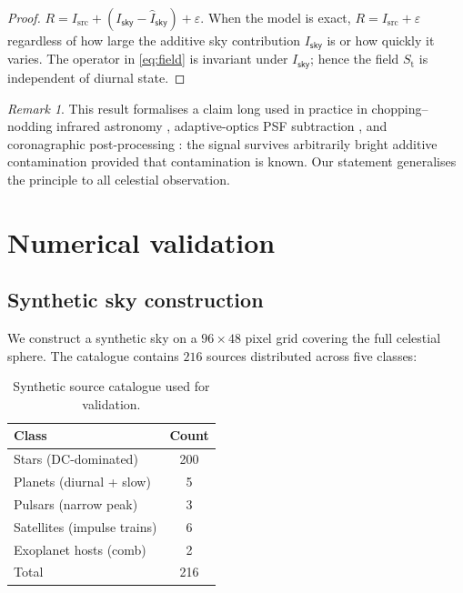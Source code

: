 \documentclass[11pt,twocolumn,a4paper]{article}
\theoremstyle{definition}
\theoremstyle{remark}
\newtheorem{remark}[theorem]{Remark}
\newcommand{\Sfield}{S_{\mathrm{t}}}
\newcommand{\sky}{\mathsf{sky}}
\newcommand{\src}{\mathrm{src}}
\begin{document}
\begin{proof}
$R = I_\src + (I_\sky - \widehat{I}_\sky) + \varepsilon$. When the
model is exact, $R = I_\src + \varepsilon$ regardless of how large the
additive sky contribution $I_\sky$ is or how quickly it varies. The
operator in \eqref{eq:field} is invariant under $I_\sky$; hence the
field $\Sfield$ is independent of diurnal state.
\end{proof}

\begin{remark}
This result formalises a claim long used in practice in
chopping--nodding infrared astronomy \citep{longmore1979}, adaptive-optics
PSF subtraction \citep{marois2006}, and coronagraphic post-processing
\citep{thalmann2011}: the signal survives arbitrarily bright additive
contamination provided that contamination is known. Our statement
generalises the principle to all celestial observation.
\end{remark}

\section{Numerical validation}
\label{sec:validation}

\subsection{Synthetic sky construction}

We construct a synthetic sky on a $96 \times 48$ pixel grid covering
the full celestial sphere. The catalogue contains $216$ sources
distributed across five classes:

\begin{table}[H]
\centering\small
\caption{Synthetic source catalogue used for validation.}
\label{tab:catalogue}
\begin{tabular}{lc}
\toprule
Class & Count \\
\midrule
Stars (DC-dominated)       & 200 \\
Planets (diurnal + slow)   & 5 \\
Pulsars (narrow peak)      & 3 \\
Satellites (impulse trains) & 6 \\
Exoplanet hosts (comb)     & 2 \\
\midrule
Total                      & 216 \\
\bottomrule
\end{tabular}
\end{table}
\end{document}
